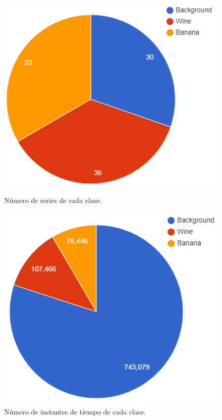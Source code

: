 \documentclass{esannV2}
\begin{document}
\begin{figure}[ht]
\centering
\begin{minipage}{.48\textwidth}
  \centering
  \includegraphics[scale=0.35]{figuras/proporcionClases.png}
  \caption{Número de series de cada clase.}
  \label{fig:proporcionClases}
\end{minipage}%
\quad
\begin{minipage}{.48\textwidth}
  \centering
  \includegraphics[scale=0.35]{figuras/proporcionInstanciasClases.png}
  \caption{Número de instantes de tiempo de cada clase.} \label{fig:proporcionInstanciasClases}
\end{minipage}
\end{figure}
\end{document}
